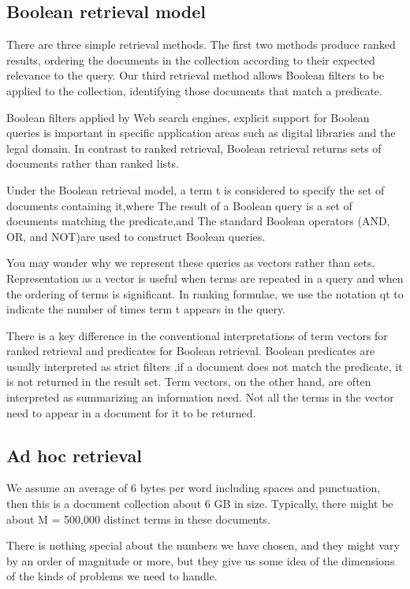 \subsection{Boolean retrieval model}

There are three simple retrieval methods. The first two methods produce ranked results, ordering the documents in the collection according to their expected relevance to the query. Our third retrieval method allows Boolean filters to be applied to the collection, identifying those documents that match a predicate.
 
Boolean filters applied by Web search engines, explicit support for Boolean queries is important in specific application areas such as digital libraries and the legal domain. In contrast to ranked retrieval, Boolean retrieval returns sets of documents rather than ranked lists.

Under the Boolean retrieval model, a term t is considered to specify the set of documents containing it,where The result of a Boolean query is a set of documents matching the predicate,and The standard Boolean operators (AND, OR, and NOT)are used to construct Boolean queries.

You may wonder why we represent these queries as vectors rather than sets. Representation as a vector is useful when terms are repeated in a query and when the ordering of terms is significant. In ranking formulae, we use the notation qt to indicate the number of times term t appears in the query.

There is a key difference in the conventional interpretations of term vectors for ranked retrieval and predicates for Boolean retrieval. Boolean predicates are usually interpreted as strict filters ,if a document does not match the predicate, it is not returned in the result set. Term vectors, on the other hand, are often interpreted as summarizing an information need. Not all the terms in the vector need to appear in a document for it to be returned. 

\subsection{Ad hoc retrieval}

We assume an average of 6 bytes per word including spaces and punctuation, then this is a document collection about 6 GB in size. Typically, there might be about M = 500,000 distinct terms in these documents. 

There is nothing special about the numbers we have chosen, and they might vary by an order of magnitude or more, but they give us some idea of the dimensions of the kinds of problems we need to handle. 

